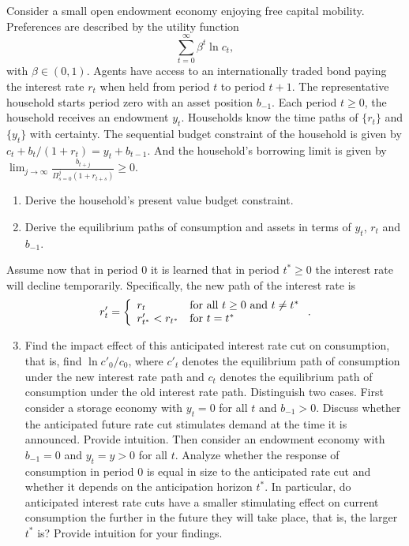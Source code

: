 \begin{exercise} 

Consider a small open  endowment economy enjoying free capital mobility.  Preferences are described by the utility function
\[
 \sum_{t=0}^{\infty} \beta^t \ln c_t,
\]
with $\beta\in (0,1)$. Agents have access to an internationally traded  bond paying the interest rate $r_t$ when held from period $t$ to period $t+1$. 
The representative household starts period zero with an asset position $b_{-1}$. Each period $t\ge 0$, the household receives an endowment $y_t$. Households know the time paths of $\{r_t\}$ and $\{y_t\}$ with certainty. The sequential budget constraint of the household is given by $c_t + b_t/(1+r_t) = y_t + b_{t-1}$. And the household's borrowing limit is given by $\lim_{j\rightarrow \infty} \frac{b_{t+j}}{\Pi_{s=0}^j (1+r_{t+s})}\ge 0$.

\begin{enumerate}
  \item Derive the household's present value budget constraint. 
  \item Derive the equilibrium paths of consumption and assets in terms of $y_t$, $r_t$ and $b_{-1}$. 
\end{enumerate}

Assume now that in period 0 it is learned that in period $t^*\ge 0$ the interest rate will decline temporarily. Specifically, the new path of the interest rate is
\[
r'_t = \left\{
 \begin{array}{ll}
r_t &\mbox{for all  $t\ge 0$ and $t \neq t^*$}\\
r'_{t^*}<r_{t^*} &\mbox{for $ t=t^*$}\\
\end{array}
\right.
.
\]
\begin{enumerate}\setcounter{enumi}{2}
\item Find the impact effect of this anticipated interest rate cut on consumption, that is, find $\ln c'_0/c_0$, where $c'_t$ denotes the equilibrium path of consumption under the new interest rate path and $c_t$ denotes the equilibrium path of consumption under the old interest rate path. 
 Distinguish two cases. First consider  a storage economy with $y_t=0$ for all $t$ and $b_{-1}>0$. 
Discuss whether the anticipated future rate cut stimulates demand at the time it is announced. Provide intuition. Then consider an endowment economy with $b_{-1}=0$ and $y_t=y>0$ for all $t$.  Analyze whether the response of consumption in period 0 is equal in size to the anticipated rate cut and whether it  depends on the anticipation horizon $t^*$. In particular, do anticipated interest rate cuts have a smaller stimulating effect on current consumption the further in the future they will take place, that is, the larger $t^*$ is? Provide intuition for your findings. 


\end{enumerate}
\end{exercise}
